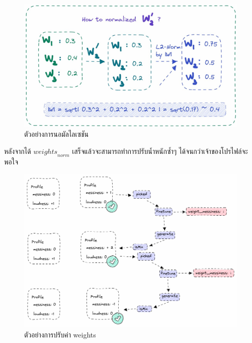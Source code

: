 \begin{figure}[h]
  \begin{center}
    \includegraphics[width=\linewidth]{photo/diagram/weight_norm.jpeg}
  \end{center}
  \caption{ตัวอย่างการนอมัลไลเซชัน}
  \label{fig:weight-norm}
\end{figure}

หลังจากได้ $\mathit{weights}_\mathit{norm}$ เสร็จแล้วจะสามารถทำการปรับน้ำหนักซ้ำๆ ได้จนกว่าเจ้าของโปรไฟล์จะพอใจ
\begin{figure}[h]
  \begin{center}
    \includegraphics[width=\linewidth]{photo/diagram/finetune_flow.png}
  \end{center}
  \caption{ตัวอย่างการปรับค่า weights}
  \label{fig:finetune-flow}
\end{figure}


